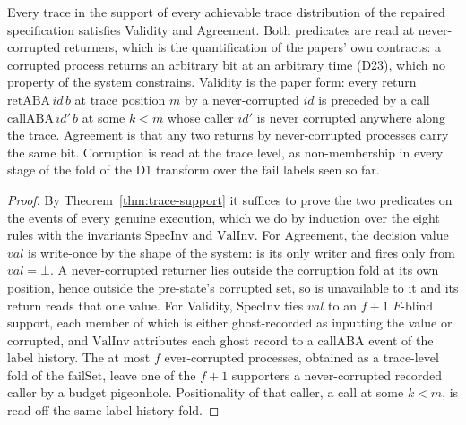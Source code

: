 \begin{theorem}
  \label{thm:aba-spec-safe}
  \leanok
  Every trace in the support of every achievable trace distribution of the repaired specification satisfies Validity and Agreement.\leanok{}\leanok{}
  Both predicates are read at never-corrupted returners, which is the quantification of the papers' own contracts: a corrupted process returns an arbitrary bit at an arbitrary time (D23), which no property of the system constrains.
  Validity is the paper form: every return $\mathrm{retABA}\,id\,b$ at trace position $m$ by a never-corrupted $id$ is preceded by a call $\mathrm{callABA}\,id'\,b$ at some $k < m$ whose caller $id'$ is never corrupted anywhere along the trace.
  Agreement is that any two returns by never-corrupted processes carry the same bit.
  Corruption is read at the trace level, as non-membership in every stage of the fold of the D1 transform over the $\mathrm{fail}$ labels seen so far.
\end{theorem}

\begin{proof}\leanok
  By Theorem~\ref{thm:trace-support} it suffices to prove the two predicates on the events of every genuine execution, which we do by induction over the eight rules with the invariants $\mathrm{SpecInv}$ and $\mathrm{ValInv}$.
  For Agreement, the decision value $val$ is write-once by the shape of the system:  is its only writer and fires only from $val = \bot$.
  A never-corrupted returner lies outside the corruption fold at its own position, hence outside the pre-state's corrupted set, so  is unavailable to it and its return reads that one value.
  For Validity, $\mathrm{SpecInv}$ ties $val$ to an $f{+}1$ $F$-blind support, each member of which is either ghost-recorded as inputting the value or corrupted, and $\mathrm{ValInv}$ attributes each ghost record to a $\mathrm{callABA}$ event of the label history.
  The at most $f$ ever-corrupted processes, obtained as a trace-level fold of the $\mathrm{failSet}$, leave one of the $f{+}1$ supporters a never-corrupted recorded caller by a budget pigeonhole.
  Positionality of that caller, a call at some $k < m$, is read off the same label-history fold.
\end{proof}
